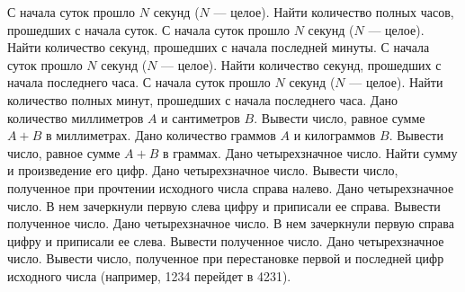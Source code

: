 С начала суток прошло $N$ секунд ($N$ --- целое). Найти количество полных часов, прошедших с начала суток.
С начала суток прошло $N$ секунд ($N$ --- целое). Найти количество секунд, прошедших с начала последней минуты.
С начала суток прошло $N$ секунд ($N$ --- целое). Найти количество секунд, прошедших с начала последнего часа.
С начала суток прошло $N$ секунд ($N$ --- целое). Найти количество полных минут, прошедших с начала последнего часа.
Дано количество миллиметров $A$ и сантиметров $B$. Вывести число, равное сумме $A + B$ в миллиметрах.
Дано количество граммов $A$ и килограммов $B$. Вывести число, равное сумме $A + B$ в граммах.
Дано четырехзначное число. Найти сумму и произведение его цифр.
Дано четырехзначное число. Вывести число, полученное при прочтении исходного числа справа налево.
Дано четырехзначное число. В нем зачеркнули первую слева цифру и приписали ее справа. Вывести полученное число.
Дано четырехзначное число. В нем зачеркнули первую справа цифру и приписали ее слева. Вывести полученное число.
Дано четырехзначное число. Вывести число, полученное при перестановке первой и последней цифр исходного числа (например, 1234 перейдет в 4231).
